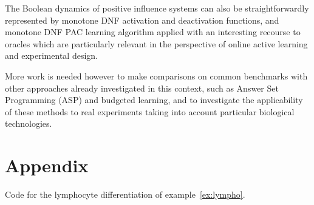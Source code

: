 \documentclass{llncs}
\begin{document}
The Boolean dynamics of positive influence systems can also be straightforwardly represented by monotone DNF activation and deactivation functions,
and monotone DNF PAC learning algorithm applied with an interesting recourse to oracles 
which are particularly relevant in the perspective of online active learning and experimental design.

More work is needed however to make comparisons on common benchmarks
with  other approaches already investigated in this context, such as Answer Set Programming (ASP) and budgeted learning,
and to investigate the applicability of these methods to real experiments taking into account particular biological technologies.



\newpage
\section*{Appendix}
\begin{listfig}[H]

\caption{Code for the lymphocyte differentiation of example~\ref{ex:lympho}.\label{bool-lympho}}
\end{listfig}
\end{document}
